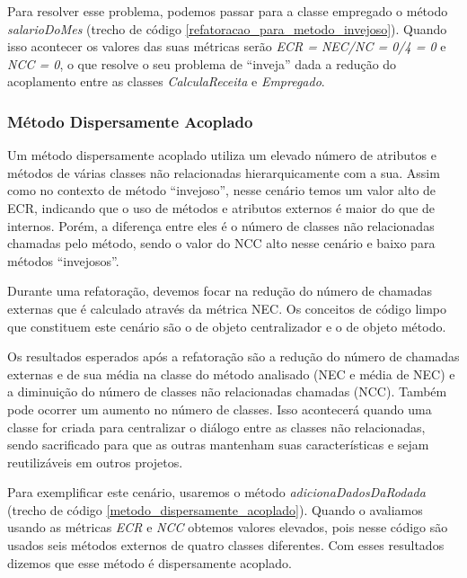                                       

Para resolver esse problema, podemos passar para a classe empregado o método \textit{salarioDoMes} (trecho de código \ref{refatoracao_para_metodo_invejoso}). Quando isso acontecer os valores das suas métricas serão \textit{ECR = NEC/NC = 0/4 = 0} e \textit{NCC = 0}, o que resolve o seu problema de ``inveja'' dada a redução do acoplamento entre as classes \textit{CalculaReceita} e \textit{Empregado}. 




\subsubsection{Método Dispersamente Acoplado}
	
Um método dispersamente acoplado utiliza um elevado número de atributos e métodos de várias classes não relacionadas hierarquicamente com a sua. Assim como no contexto de método ``invejoso'', nesse cenário temos um valor alto de ECR, indicando que o uso de métodos e atributos externos é maior do que de internos. Porém, a diferença entre eles é o número de classes não relacionadas chamadas pelo método, sendo o valor do NCC alto nesse cenário e baixo para métodos ``invejosos''.
	
Durante uma refatoração, devemos focar na redução do número de chamadas externas que é calculado através da métrica NEC. Os conceitos de código limpo que constituem este cenário são o de objeto centralizador e o de objeto método.
	
Os resultados esperados após a refatoração são a redução do número de chamadas externas e de sua média na classe do método analisado (NEC e média de NEC) e a diminuição do número de classes não relacionadas chamadas (NCC). Também pode ocorrer um aumento no número de classes. Isso acontecerá quando uma classe for criada para centralizar o diálogo entre as classes não relacionadas, sendo sacrificado para que as outras mantenham suas características e sejam reutilizáveis em outros projetos. 
	  
Para exemplificar este cenário, usaremos o método \textit{adicionaDadosDaRodada} (trecho de código \ref{metodo_dispersamente_acoplado}). Quando o avaliamos usando as métricas \textit{ECR} e \textit{NCC} obtemos valores elevados, pois nesse código são usados seis métodos externos de quatro classes diferentes. Com esses resultados dizemos que esse método é dispersamente acoplado.
  
